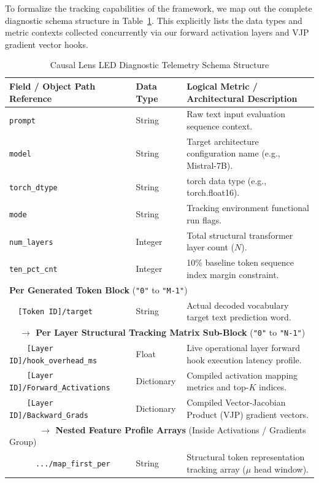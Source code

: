 \documentclass[10pt,conference]{IEEEtran}
\begin{document}
To formalize the tracking capabilities of the framework, we map out the complete diagnostic schema structure in Table~\ref{tab:telemetry_schema}. This explicitly lists the data types and metric contexts collected concurrently via our forward activation layers and VJP gradient vector hooks.
\begin{table}[htbp]
\centering
\caption{Causal Lens LED Diagnostic Telemetry Schema Structure}
\label{tab:telemetry_schema}
\begin{tabular}{lll}
\toprule
\textbf{Field / Object Path Reference} & \textbf{Data Type} & \textbf{Logical Metric / Architectural Description} \\
\midrule
\texttt{prompt} & String & Raw text input evaluation sequence context. \\
\texttt{model} & String & Target architecture configuration name (e.g., Mistral-7B). \\
\texttt{torch\_dtype} & String & torch data type (e.g., torch.float16). \\
\texttt{mode} & String & Tracking environment functional run flags. \\
\texttt{num\_layers} & Integer & Total structural transformer layer count ($N$). \\
\texttt{ten\_pct\_cnt} & Integer & 10\% baseline token sequence index margin constraint. \\
\midrule
\multicolumn{3}{l}{\textbf{Per Generated Token Block} (\texttt{"0"} to \texttt{"M-1"})}\\
\midrule
\texttt{\ \ [Token ID]/target} & String & Actual decoded vocabulary target text prediction word. \\
\midrule
\multicolumn{3}{l}{\textbf{\ \ $\rightarrow$ Per Layer Structural Tracking Matrix Sub-Block} (\texttt{"0"} to \texttt{"N-1"})}\\
\midrule
\texttt{\ \ \ \ [Layer ID]/hook\_overhead\_ms} & Float & Live operational layer forward hook execution latency profile. \\
\texttt{\ \ \ \ [Layer ID]/Forward\_Activations} & Dictionary & Compiled activation mapping metrics and top-$K$ indices. \\
\texttt{\ \ \ \ [Layer ID]/Backward\_Grads} & Dictionary & Compiled Vector-Jacobian Product (VJP) gradient vectors. \\
\midrule
\multicolumn{3}{l}{\textbf{\ \ \ \ \ \ $\rightarrow$ Nested Feature Profile Arrays} (Inside Activations / Gradients Group)}\\
\midrule
\texttt{\ \ \ \ \ \ .../map\_first\_per} & String & Structural token representation tracking array ($\mu$ head window). \\

\end{tabular}
\end{table}
\end{document}
